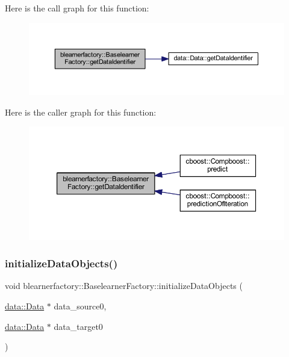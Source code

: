 Here is the call graph for this function\+:\nopagebreak
\begin{figure}[H]
\begin{center}
\leavevmode
\includegraphics[width=350pt]{classblearnerfactory_1_1_baselearner_factory_a40703963bb3fd273b835a99263d9b599_cgraph}
\end{center}
\end{figure}
Here is the caller graph for this function\+:\nopagebreak
\begin{figure}[H]
\begin{center}
\leavevmode
\includegraphics[width=350pt]{classblearnerfactory_1_1_baselearner_factory_a40703963bb3fd273b835a99263d9b599_icgraph}
\end{center}
\end{figure}
\mbox{\label{classblearnerfactory_1_1_baselearner_factory_a147d4ef123ec382fe402d562a91df4d2}} 
\subsubsection{\texorpdfstring{initialize\+Data\+Objects()}{initializeDataObjects()}}
{\footnotesize\ttfamily void blearnerfactory\+::\+Baselearner\+Factory\+::initialize\+Data\+Objects (\begin{DoxyParamCaption}\item[{\mbox{\hyperlink{classdata_1_1_data}{data\+::\+Data}} $\ast$}]{data\+\_\+source0,  }\item[{\mbox{\hyperlink{classdata_1_1_data}{data\+::\+Data}} $\ast$}]{data\+\_\+target0 }\end{DoxyParamCaption})}

